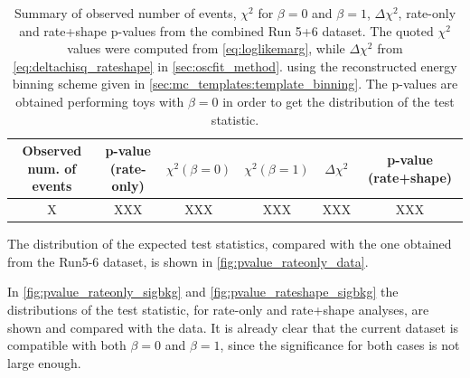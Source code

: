 %
%
\begin{table}[htb]
\centering
\begin{tabular}{| c | c | c | c | c | c |}
\hline
Observed num. of events 		& p-value (rate-only)	 	& $\chi^2 (\beta=0)$ 		& $\chi^2 (\beta=1)$	 	& $\Delta \chi^2$ 	& p-value (rate+shape)  	\\
\hline
X				 		& XXX 		 		& XXX				& XXX				& XXX		 	& XXX			  	\\

\hline
\end{tabular}
\caption{
Summary of observed number of events, $\chi^2$ for $\beta=0$ and $\beta=1$, $\Delta \chi^2$, rate-only and rate+shape p-values from the combined Run 5+6 dataset.
The quoted $\chi^2$ values were computed from \cref{eq:loglikemarg},
while $\Delta \chi^2$ from \cref{eq:deltachisq_rateshape} in \cref{sec:oscfit_method}.
using the reconstructed energy binning scheme given in \cref{sec:mc_templates:template_binning}.
The p-values are obtained performing \NumToysLarge toys with $\beta=0$ in order to get the distribution of the test statistic.
}
\label{tab:results}
\end{table}



%

The distribution of the expected test statistics, compared with the one obtained from the Run5-6 dataset, is shown in \cref{fig:pvalue_rateonly_data}.


%
%

In \cref{fig:pvalue_rateonly_sigbkg} and \cref{fig:pvalue_rateshape_sigbkg}
the distributions of the test statistic, for rate-only and rate+shape analyses, are shown and compared with the data.
It is already clear that the current dataset is compatible with both $\beta=0$ and $\beta=1$, since the 
significance for both cases is not large enough.

